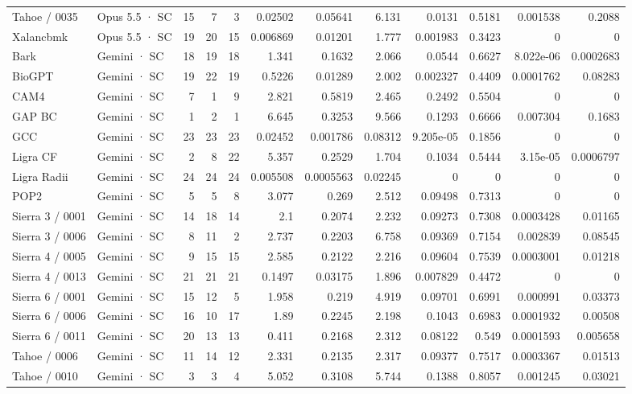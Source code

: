\begin{tabular}{llrrrrrrrrrr}
Tahoe / 0035 & Opus 5.5 · SC & 15 & 7 & 3 & 0.02502 & 0.05641 & 6.131 & 0.0131 & 0.5181 & 0.001538 & 0.2088 \\
Xalancbmk & Opus 5.5 · SC & 19 & 20 & 15 & 0.006869 & 0.01201 & 1.777 & 0.001983 & 0.3423 & 0 & 0 \\
Bark & Gemini · SC & 18 & 19 & 18 & 1.341 & 0.1632 & 2.066 & 0.0544 & 0.6627 & 8.022e-06 & 0.0002683 \\
BioGPT & Gemini · SC & 19 & 22 & 19 & 0.5226 & 0.01289 & 2.002 & 0.002327 & 0.4409 & 0.0001762 & 0.08283 \\
CAM4 & Gemini · SC & 7 & 1 & 9 & 2.821 & 0.5819 & 2.465 & 0.2492 & 0.5504 & 0 & 0 \\
GAP BC & Gemini · SC & 1 & 2 & 1 & 6.645 & 0.3253 & 9.566 & 0.1293 & 0.6666 & 0.007304 & 0.1683 \\
GCC & Gemini · SC & 23 & 23 & 23 & 0.02452 & 0.001786 & 0.08312 & 9.205e-05 & 0.1856 & 0 & 0 \\
Ligra CF & Gemini · SC & 2 & 8 & 22 & 5.357 & 0.2529 & 1.704 & 0.1034 & 0.5444 & 3.15e-05 & 0.0006797 \\
Ligra Radii & Gemini · SC & 24 & 24 & 24 & 0.005508 & 0.0005563 & 0.02245 & 0 & 0 & 0 & 0 \\
POP2 & Gemini · SC & 5 & 5 & 8 & 3.077 & 0.269 & 2.512 & 0.09498 & 0.7313 & 0 & 0 \\
Sierra 3 / 0001 & Gemini · SC & 14 & 18 & 14 & 2.1 & 0.2074 & 2.232 & 0.09273 & 0.7308 & 0.0003428 & 0.01165 \\
Sierra 3 / 0006 & Gemini · SC & 8 & 11 & 2 & 2.737 & 0.2203 & 6.758 & 0.09369 & 0.7154 & 0.002839 & 0.08545 \\
Sierra 4 / 0005 & Gemini · SC & 9 & 15 & 15 & 2.585 & 0.2122 & 2.216 & 0.09604 & 0.7539 & 0.0003001 & 0.01218 \\
Sierra 4 / 0013 & Gemini · SC & 21 & 21 & 21 & 0.1497 & 0.03175 & 1.896 & 0.007829 & 0.4472 & 0 & 0 \\
Sierra 6 / 0001 & Gemini · SC & 15 & 12 & 5 & 1.958 & 0.219 & 4.919 & 0.09701 & 0.6991 & 0.000991 & 0.03373 \\
Sierra 6 / 0006 & Gemini · SC & 16 & 10 & 17 & 1.89 & 0.2245 & 2.198 & 0.1043 & 0.6983 & 0.0001932 & 0.00508 \\
Sierra 6 / 0011 & Gemini · SC & 20 & 13 & 13 & 0.411 & 0.2168 & 2.312 & 0.08122 & 0.549 & 0.0001593 & 0.005658 \\
Tahoe / 0006 & Gemini · SC & 11 & 14 & 12 & 2.331 & 0.2135 & 2.317 & 0.09377 & 0.7517 & 0.0003367 & 0.01513 \\
Tahoe / 0010 & Gemini · SC & 3 & 3 & 4 & 5.052 & 0.3108 & 5.744 & 0.1388 & 0.8057 & 0.001245 & 0.03021 \\

\end{tabular}
